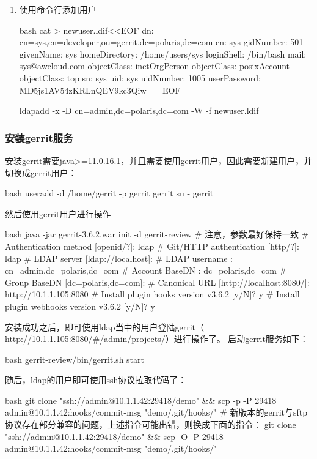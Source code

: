 \begin{enumerate}
\begin{code-block}{bash}
  # 启动httpd
  systemctl start httpd
  systemctl enable httpd

  # 使用浏览器访问http://<ip>/ldapadmin，用户名/密码cn=admin,dc=polaris,dc=com/passwd
  \end{code-block}

  \item 使用命令行添加用户
  \begin{code-block}{bash}
  cat > newuser.ldif<<EOF
  dn: cn=sys,cn=developer,ou=gerrit,dc=polaris,dc=com
  cn: sys
  gidNumber: 501
  givenName: sys
  homeDirectory: /home/users/sys
  loginShell: /bin/bash
  mail: sys@awcloud.com
  objectClass: inetOrgPerson
  objectClass: posixAccount
  objectClass: top
  sn: sys
  uid: sys
  uidNumber: 1005
  userPassword: {MD5}js1AV54zKRLnQEV9kc3Qiw==
  EOF

  ldapadd -x -D cn=admin,dc=polaris,dc=com -W -f newuser.ldif
  \end{code-block}


\end{enumerate}

\subsubsection{安装gerrit服务}
安装gerrit需要java>=11.0.16.1，并且需要使用gerrit用户，因此需要新建用户，并切换成gerrit用户：
\begin{code-block}{bash}
useradd -d /home/gerrit  -p gerrit  gerrit
su - gerrit
\end{code-block}

然后使用gerrit用户进行操作
\begin{code-block}{bash}
java -jar gerrit-3.6.2.war init -d gerrit-review
# 注意，参数最好保持一致
# Authentication method          [openid/?]: ldap
# Git/HTTP authentication        [http/?]: ldap
# LDAP server                    [ldap://localhost]:
# LDAP username                  : cn=admin,dc=polaris,dc=com
# Account BaseDN                 : dc=polaris,dc=com
# Group BaseDN                   [dc=polaris,dc=com]:
# Canonical URL                  [http://localhost:8080/]: http://10.1.1.105:8080
# Install plugin hooks version v3.6.2 [y/N]? y
# Install plugin webhooks version v3.6.2 [y/N]? y
\end{code-block}

安装成功之后，即可使用ldap当中的用户登陆gerrit（\url{ http://10.1.1.105:8080/#/admin/projects/}）进行操作了。
启动gerrit服务如下：
\begin{code-block}{bash}
gerrit-review/bin/gerrit.sh start
\end{code-block}

随后，ldap的用户即可使用ssh协议拉取代码了：
\begin{code-block}{bash}
git clone "ssh://admin@10.1.1.42:29418/demo" && scp -p -P 29418 admin@10.1.1.42:hooks/commit-msg "demo/.git/hooks/"
# 新版本的gerrit与sftp协议存在部分兼容的问题，上述指令可能出错，则换成下面的指令：
git clone "ssh://admin@10.1.1.42:29418/demo" && scp -O -P 29418 admin@10.1.1.42:hooks/commit-msg "demo/.git/hooks/"
\end{code-block}
